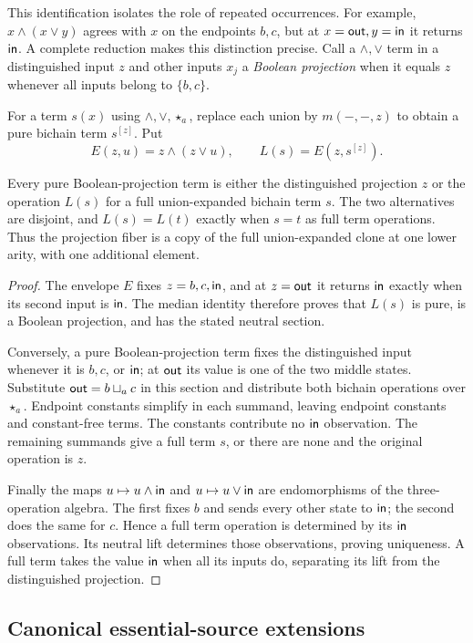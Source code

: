 This identification isolates the role of repeated occurrences. For example,
$x\wedge(x\vee y)$ agrees with $x$ on the endpoints $b,c$, but at
$x=\mathsf{out},y=\mathsf{in}$ it returns $\mathsf{in}$. A complete reduction
makes this distinction precise. Call a $\wedge,\vee$ term in a distinguished
input $z$ and other inputs $x_j$ a \emph{Boolean projection} when it equals
$z$ whenever all inputs belong to $\{b,c\}$.

For a term $s(x)$ using $\wedge,\vee,\star_a$, replace each union by
$m(-,-,z)$ to obtain a pure bichain term $s^{[z]}$. Put
\[
 E(z,u)=z\wedge(z\vee u),\qquad L(s)=E(z,s^{[z]}).
\]

\begin{theorem}\label{core:thm:bichain-fiber}
Every pure Boolean-projection term is either the distinguished projection
$z$ or the operation $L(s)$ for a full union-expanded bichain term $s$.
The two alternatives are disjoint, and $L(s)=L(t)$ exactly when $s=t$
as full term operations. Thus the projection fiber is a copy of the full
union-expanded clone at one lower arity, with one additional element.
\end{theorem}
\begin{proof}
The envelope $E$ fixes $z=b,c,\mathsf{in}$, and at $z=\mathsf{out}$ it
returns $\mathsf{in}$ exactly when its second input is $\mathsf{in}$.
The median identity therefore proves that $L(s)$ is pure, is a Boolean
projection, and has the stated neutral section.

Conversely, a pure Boolean-projection term fixes the distinguished input
whenever it is $b,c$, or $\mathsf{in}$; at $\mathsf{out}$ its value is one
of the two middle states. Substitute
$\mathsf{out}=b\sqcup_a c$ in this section and distribute both bichain
operations over $\star_a$. Endpoint constants simplify in each summand,
leaving endpoint constants and constant-free terms. The constants contribute
no $\mathsf{in}$ observation. The remaining summands give a full term $s$,
or there are none and the original operation is $z$.

Finally the maps $u\mapsto u\wedge\mathsf{in}$ and
$u\mapsto u\vee\mathsf{in}$ are endomorphisms of the three-operation
algebra. The first fixes $b$ and sends every other state to $\mathsf{in}$;
the second does the same for $c$. Hence a full term operation is determined
by its $\mathsf{in}$ observations. Its neutral lift determines those
observations, proving uniqueness. A full term takes the value $\mathsf{in}$
when all its inputs do, separating its lift from the distinguished projection.
\end{proof}

\subsection{Canonical essential-source extensions}
\label{app:core-cographs}

